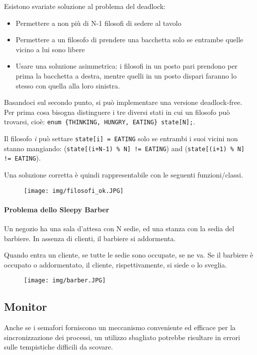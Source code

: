 \documentclass[a4]{article}
\begin{document}
Esistono svariate soluzione al problema del deadlock:
\begin{itemize}
    \item Permettere a non più di N-1 filosofi di sedere al tavolo
    \item Permettere a un filosofo di prendere una bacchetta solo se entrambe quelle vicino a lui sono libere
    \item Usare una soluzione asimmetrica: i filosofi in un posto pari prendono per prima la bacchetta a destra, mentre quelli in un posto dispari faranno lo stesso con quella alla loro sinistra.
\end{itemize}
Basandoci sul secondo punto, si può implementare una versione deadlock-free. Per prima cosa bisogna distinguere i tre diversi stati in cui un filosofo può trovarsi, cioè: \texttt{enum \{THINKING, HUNGRY, EATING\} state[N];}.

Il filosofo \textit{i} può settare \texttt{state[i] = EATING} solo se entrambi i suoi vicini non stanno mangiando: (\texttt{state[(i+N-1) \% N] != EATING}) and (\texttt{state[(i+1) \% N] != EATING}).

Una soluzione corretta è quindi rappresentabile con le seguenti funzioni/classi.
\begin{figure}[h!]
    \texttt{[image: img/filosofi\_ok.JPG]}
\end{figure}

\paragraph{Problema dello Sleepy Barber}
Un negozio ha una sala d'attesa con N sedie, ed una stanza con la sedia del barbiere. In assenza di clienti, il barbiere si addormenta.

Quando entra un cliente, se tutte le sedie sono occupate, se ne va. Se il barbiere è occupato o addormentato, il cliente, rispettivamente, si siede o lo sveglia.
\begin{figure}[h!]
    \texttt{[image: img/barber.JPG]}
\end{figure}

\subsection{Monitor}
Anche se i semafori forniscono un meccanismo conveniente ed efficace per la sincronizzazione dei processi, un utilizzo sbagliato potrebbe risultare in errori sulle tempistiche difficili da scovare.
\end{document}
